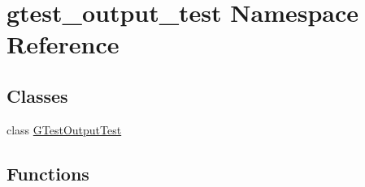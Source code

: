 \hypertarget{namespacegtest__output__test}{}\section{gtest\+\_\+output\+\_\+test Namespace Reference}
\label{namespacegtest__output__test}
\subsection*{Classes}
\begin{DoxyCompactItemize}
\item 
class \hyperlink{classgtest__output__test_1_1GTestOutputTest}{G\+Test\+Output\+Test}
\end{DoxyCompactItemize}
\subsection*{Functions}
